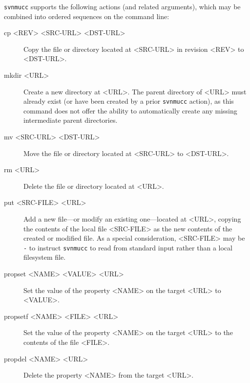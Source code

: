 \texttt{svnmucc} supports the following actions (and related arguments),
which may be combined into ordered sequences on the command line:

\begin{description}
\item[cp \textless REV\textgreater{} \textless SRC-URL\textgreater{}
\textless DST-URL\textgreater{}]
Copy the file or directory located at \textless SRC-URL\textgreater{} in
revision \textless REV\textgreater{} to \textless DST-URL\textgreater.
\item[mkdir \textless URL\textgreater{}]
Create a new directory at \textless URL\textgreater. The parent
directory of \textless URL\textgreater{} must already exist (or have
been created by a prior \texttt{svnmucc} action), as this command does
not offer the ability to automatically create any missing intermediate
parent directories.
\item[mv \textless SRC-URL\textgreater{}
\textless DST-URL\textgreater{}]
Move the file or directory located at \textless SRC-URL\textgreater{} to
\textless DST-URL\textgreater.
\item[rm \textless URL\textgreater{}]
Delete the file or directory located at \textless URL\textgreater.
\item[put \textless SRC-FILE\textgreater{} \textless URL\textgreater{}]
Add a new file---or modify an existing one---located at
\textless URL\textgreater, copying the contents of the local file
\textless SRC-FILE\textgreater{} as the new contents of the created or
modified file. As a special consideration,
\textless SRC-FILE\textgreater{} may be \texttt{-} to instruct
\texttt{svnmucc} to read from standard input rather than a local
filesystem file.
\item[propset \textless NAME\textgreater{} \textless VALUE\textgreater{}
\textless URL\textgreater{}]
Set the value of the property \textless NAME\textgreater{} on the target
\textless URL\textgreater{} to \textless VALUE\textgreater.
\item[propsetf \textless NAME\textgreater{} \textless FILE\textgreater{}
\textless URL\textgreater{}]
Set the value of the property \textless NAME\textgreater{} on the target
\textless URL\textgreater{} to the contents of the file
\textless FILE\textgreater.
\item[propdel \textless NAME\textgreater{} \textless URL\textgreater{}]
Delete the property \textless NAME\textgreater{} from the target
\textless URL\textgreater.
\end{description}

